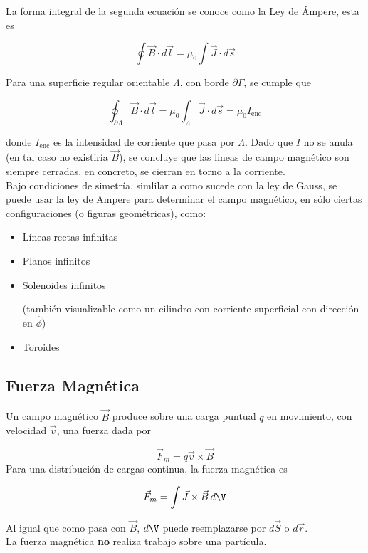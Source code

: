 La forma integral de la segunda ecuación se conoce como la Ley de Ámpere, esta es

\[ \oint \vec{B}\cdot d\vec{l} = \mu_0\int \vec{J}\cdot d\vec{s} \]

Para una superficie regular orientable $\Lambda$, con borde $\partial\Gamma$, se cumple que

\[\oint_{\partial\Lambda}\vec{B}\cdot d\vec{l} = \mu_0\int_\Lambda \vec{J}\cdot d\vec{s} = \mu_0I_{\text{enc}}\]

donde $I_{\text{enc}}$ es la intensidad de corriente que pasa por $\Lambda$. Dado que $I$ no se anula (en tal caso no existiría $\vec{B}$), se concluye que las lineas de campo magnético son siempre cerradas, en concreto, se cierran en torno a la corriente.\\

Bajo condiciones de simetría, simlilar a como sucede con la ley de Gauss, se puede usar la ley de Ampere para determinar el campo magnético, en sólo ciertas configuraciones (o figuras geométricas), como:
\begin{itemize}
    \item Líneas rectas infinitas
    \item Planos infinitos
    \item Solenoides infinitos 
    
    
    (también visualizable como un cilindro con corriente superficial con dirección en $\hat \phi$)
    \item Toroides
\end{itemize}


\subsection{Fuerza Magnética}

Un campo magnético $\Vec{B}$ produce sobre una carga puntual $q$ en movimiento, con velocidad $\Vec{v}$, una fuerza dada por

\[\Vec{F}_m=q\Vec{v}\times\Vec{B}\]
\bigbreak
Para una distribución de cargas continua, la fuerza magnética es

\[\Vec{F}_m=\int\Vec{J}\times\Vec{B}\,d\V\]

Al igual que como pasa con $\Vec{B}$, $d\V$ puede reemplazarse por $d\Vec{S}$ o $d\Vec{r}$.\\

La fuerza magnética \textbf{no} realiza trabajo sobre una partícula.


